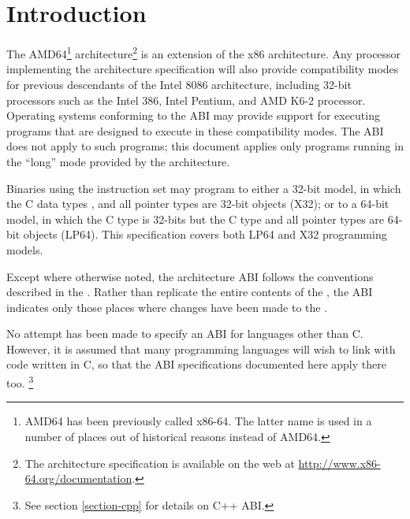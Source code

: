 \chapter{Introduction\label{intro}}

The AMD64\footnote{AMD64 has been previously called x86-64.  The
  latter name is used in a number of places out of historical reasons
  instead of AMD64.}  architecture\footnote{The architecture
  specification is available on the web at
  \url{http://www.x86-64.org/documentation}.} is an extension of the
x86 architecture.  Any processor implementing the \xARCH architecture
specification will also provide compatibility modes for previous
descendants of the Intel 8086 architecture, including 32-bit
processors such as the Intel 386, Intel Pentium, and AMD K6-2
processor.  Operating systems conforming to the \xARCH ABI may provide
support for executing programs that are designed to execute in these
compatibility modes.  The \xARCH ABI does not apply to such programs;
this document applies only programs running in the ``long'' mode
provided by the \xARCH architecture.

Binaries using the \xARCH instruction set may program to either a 32-bit
model, in which the C data types ,  and all
pointer types are 32-bit objects (X32); or to a 64-bit model,
in which the C  type is 32-bits but the C  type
and all pointer types are 64-bit objects (LP64). This specification
covers both LP64 and X32 programming models.

Except where otherwise noted, the \xARCH architecture ABI follows the
conventions described in the \intelabi.  Rather than replicate the
entire contents of the \intelabi, the \xARCH ABI indicates only those
places where changes have been made to the \intelabi.

No attempt has been made to specify an ABI for languages other than C.
However, it is assumed that many programming languages will wish to
link with code written in C, so
that the ABI specifications documented here apply there too.%
\footnote{See section \ref{section-cpp} for details on C++ ABI.}

